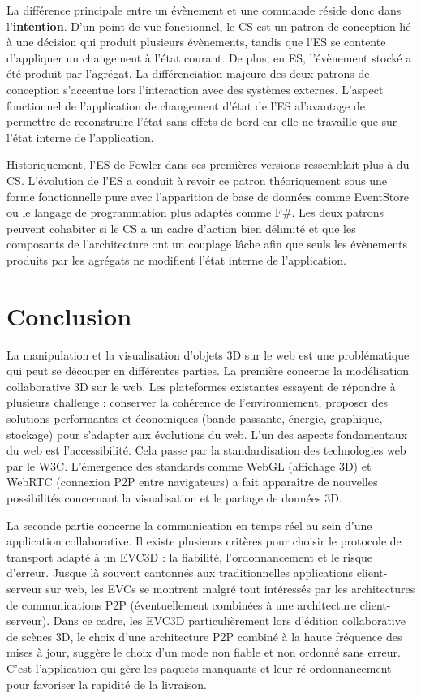 La différence principale entre un évènement et une commande réside donc dans 
l'\textbf{intention}. D'un point de vue fonctionnel, le \gls{CS} est un patron de 
conception lié à une décision qui produit plusieurs évènements, tandis que 
l'\gls{ES} se contente d'appliquer un changement à l'état courant. De plus, en 
\gls{ES}, l'évènement stocké a été produit par l'agrégat. 
La différenciation majeure des deux patrons de conception s'accentue lors 
l'interaction avec des systèmes externes. L'aspect fonctionnel de l'application de 
changement d'état de l'\gls{ES} al'avantage de permettre de reconstruire l'état sans 
effets de bord car elle ne travaille que sur l'état interne de l'application. 

Historiquement, l'\gls{ES} de Fowler dans ses premières versions ressemblait plus 
à du \gls{CS}. L'évolution de l'\gls{ES} a conduit à revoir ce patron théoriquement 
sous une forme fonctionnelle pure avec l'apparition de base de données comme 
EventStore ou le langage de programmation plus adaptés comme F\#. Les deux 
patrons peuvent cohabiter si le \gls{CS} a un cadre d'action bien délimité 
et que les composants de l'architecture ont un couplage lâche afin que seuls les 
évènements produits par les agrégats ne modifient l'état interne de l'application. 

\section{Conclusion}

La manipulation et la visualisation d'objets 3D sur le web est une problématique 
qui peut se découper en différentes parties.
La première concerne la modélisation collaborative 3D sur le web. Les plateformes 
existantes essayent de répondre à plusieurs challenge : conserver la cohérence 
de l'environnement, proposer des solutions performantes et économiques (bande 
passante, énergie, graphique, stockage)  pour s'adapter aux évolutions du web.
L'un des aspects fondamentaux du web est l'accessibilité. Cela passe par la 
standardisation des technologies web par le \gls{W3C}.  L'émergence des 
standards comme WebGL (affichage 3D) et WebRTC (connexion P2P entre navigateurs) 
a fait apparaître de nouvelles possibilités concernant la visualisation et 
le partage de données 3D. 


La seconde partie concerne la communication en temps réel au sein d'une 
application collaborative. Il existe plusieurs critères pour choisir le protocole de 
transport adapté à un \gls{EVC3D} : la fiabilité, l'ordonnancement et le risque 
d'erreur. 
Jusque là souvent cantonnés aux traditionnelles 
applications client-serveur sur web, les \glspl{EVC} se montrent malgré tout 
intéressés par les architectures de communications P2P (éventuellement 
combinées à une architecture client-serveur). Dans ce cadre, les \gls{EVC3D} 
particulièrement lors d'édition collaborative de scènes 3D, le choix d'une 
architecture \gls{P2P} combiné à la haute fréquence des mises à jour, suggère le 
choix d'un mode non fiable et non ordonné sans erreur. C'est l'application qui gère 
les 
paquets manquants et leur ré-ordonnancement pour favoriser la rapidité 
de la livraison.

